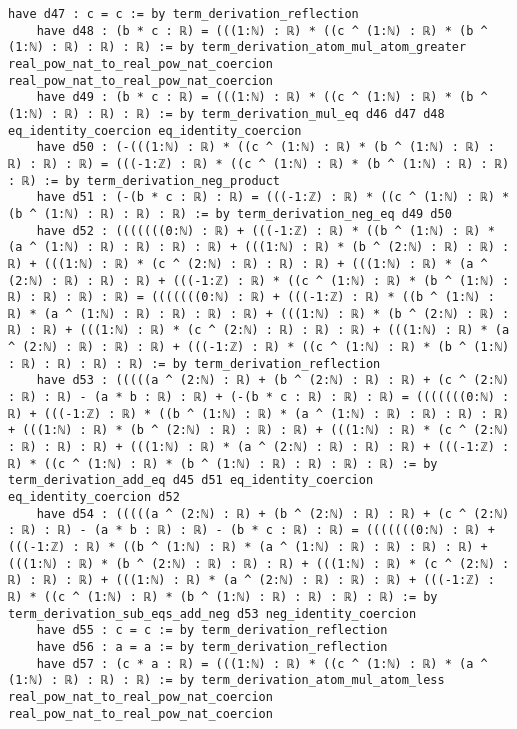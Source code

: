\documentclass{article}
\begin{document}
\begin{tcolorbox}[colback=white!10, width=\linewidth]
\begin{lstlisting}[language=Lean4]
    have d47 : c = c := by term_derivation_reflection
    have d48 : (b * c : ℝ) = (((1:ℕ) : ℝ) * ((c ^ (1:ℕ) : ℝ) * (b ^ (1:ℕ) : ℝ) : ℝ) : ℝ) := by term_derivation_atom_mul_atom_greater real_pow_nat_to_real_pow_nat_coercion real_pow_nat_to_real_pow_nat_coercion
    have d49 : (b * c : ℝ) = (((1:ℕ) : ℝ) * ((c ^ (1:ℕ) : ℝ) * (b ^ (1:ℕ) : ℝ) : ℝ) : ℝ) := by term_derivation_mul_eq d46 d47 d48 eq_identity_coercion eq_identity_coercion
    have d50 : (-(((1:ℕ) : ℝ) * ((c ^ (1:ℕ) : ℝ) * (b ^ (1:ℕ) : ℝ) : ℝ) : ℝ) : ℝ) = (((-1:ℤ) : ℝ) * ((c ^ (1:ℕ) : ℝ) * (b ^ (1:ℕ) : ℝ) : ℝ) : ℝ) := by term_derivation_neg_product
    have d51 : (-(b * c : ℝ) : ℝ) = (((-1:ℤ) : ℝ) * ((c ^ (1:ℕ) : ℝ) * (b ^ (1:ℕ) : ℝ) : ℝ) : ℝ) := by term_derivation_neg_eq d49 d50
    have d52 : (((((((0:ℕ) : ℝ) + (((-1:ℤ) : ℝ) * ((b ^ (1:ℕ) : ℝ) * (a ^ (1:ℕ) : ℝ) : ℝ) : ℝ) : ℝ) + (((1:ℕ) : ℝ) * (b ^ (2:ℕ) : ℝ) : ℝ) : ℝ) + (((1:ℕ) : ℝ) * (c ^ (2:ℕ) : ℝ) : ℝ) : ℝ) + (((1:ℕ) : ℝ) * (a ^ (2:ℕ) : ℝ) : ℝ) : ℝ) + (((-1:ℤ) : ℝ) * ((c ^ (1:ℕ) : ℝ) * (b ^ (1:ℕ) : ℝ) : ℝ) : ℝ) : ℝ) = (((((((0:ℕ) : ℝ) + (((-1:ℤ) : ℝ) * ((b ^ (1:ℕ) : ℝ) * (a ^ (1:ℕ) : ℝ) : ℝ) : ℝ) : ℝ) + (((1:ℕ) : ℝ) * (b ^ (2:ℕ) : ℝ) : ℝ) : ℝ) + (((1:ℕ) : ℝ) * (c ^ (2:ℕ) : ℝ) : ℝ) : ℝ) + (((1:ℕ) : ℝ) * (a ^ (2:ℕ) : ℝ) : ℝ) : ℝ) + (((-1:ℤ) : ℝ) * ((c ^ (1:ℕ) : ℝ) * (b ^ (1:ℕ) : ℝ) : ℝ) : ℝ) : ℝ) := by term_derivation_reflection
    have d53 : (((((a ^ (2:ℕ) : ℝ) + (b ^ (2:ℕ) : ℝ) : ℝ) + (c ^ (2:ℕ) : ℝ) : ℝ) - (a * b : ℝ) : ℝ) + (-(b * c : ℝ) : ℝ) : ℝ) = (((((((0:ℕ) : ℝ) + (((-1:ℤ) : ℝ) * ((b ^ (1:ℕ) : ℝ) * (a ^ (1:ℕ) : ℝ) : ℝ) : ℝ) : ℝ) + (((1:ℕ) : ℝ) * (b ^ (2:ℕ) : ℝ) : ℝ) : ℝ) + (((1:ℕ) : ℝ) * (c ^ (2:ℕ) : ℝ) : ℝ) : ℝ) + (((1:ℕ) : ℝ) * (a ^ (2:ℕ) : ℝ) : ℝ) : ℝ) + (((-1:ℤ) : ℝ) * ((c ^ (1:ℕ) : ℝ) * (b ^ (1:ℕ) : ℝ) : ℝ) : ℝ) : ℝ) := by term_derivation_add_eq d45 d51 eq_identity_coercion eq_identity_coercion d52
    have d54 : (((((a ^ (2:ℕ) : ℝ) + (b ^ (2:ℕ) : ℝ) : ℝ) + (c ^ (2:ℕ) : ℝ) : ℝ) - (a * b : ℝ) : ℝ) - (b * c : ℝ) : ℝ) = (((((((0:ℕ) : ℝ) + (((-1:ℤ) : ℝ) * ((b ^ (1:ℕ) : ℝ) * (a ^ (1:ℕ) : ℝ) : ℝ) : ℝ) : ℝ) + (((1:ℕ) : ℝ) * (b ^ (2:ℕ) : ℝ) : ℝ) : ℝ) + (((1:ℕ) : ℝ) * (c ^ (2:ℕ) : ℝ) : ℝ) : ℝ) + (((1:ℕ) : ℝ) * (a ^ (2:ℕ) : ℝ) : ℝ) : ℝ) + (((-1:ℤ) : ℝ) * ((c ^ (1:ℕ) : ℝ) * (b ^ (1:ℕ) : ℝ) : ℝ) : ℝ) : ℝ) := by term_derivation_sub_eqs_add_neg d53 neg_identity_coercion
    have d55 : c = c := by term_derivation_reflection
    have d56 : a = a := by term_derivation_reflection
    have d57 : (c * a : ℝ) = (((1:ℕ) : ℝ) * ((c ^ (1:ℕ) : ℝ) * (a ^ (1:ℕ) : ℝ) : ℝ) : ℝ) := by term_derivation_atom_mul_atom_less real_pow_nat_to_real_pow_nat_coercion real_pow_nat_to_real_pow_nat_coercion

\end{lstlisting}
\end{tcolorbox}
\end{document}
